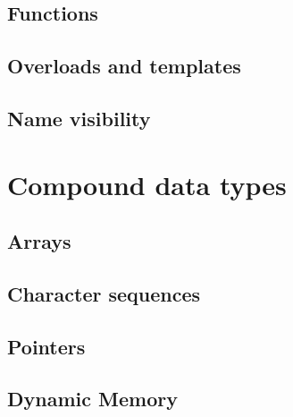 \documentclass{beamer}
\begin{document}
\subsection{Functions}
\begin{frame}

\end{frame}

\subsection{Overloads and templates}
\begin{frame}

\end{frame}
\subsection{Name visibility}
\begin{frame}

\end{frame}

\section{Compound data types}
\subsection{Arrays}
\begin{frame}

\end{frame}

\subsection{Character sequences}
\begin{frame}

\end{frame}

\subsection{Pointers}
\begin{frame}

\end{frame}

\subsection{Dynamic Memory}
\begin{frame}

\end{frame}
\end{document}
